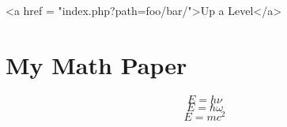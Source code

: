\documentclass[11pt]{article}
\begin{document}
    <a href = "index.php?path=foo/bar/">Up a Level</a>


\section{
My Math Paper}



    $$E = h\nu$$
    $$E = \hbar\omega$$
    $$E = mc^2$$
\end{document}
